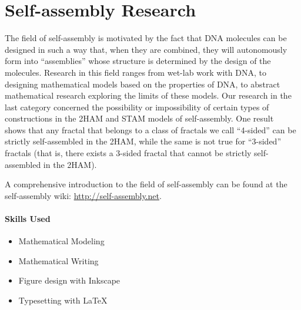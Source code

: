 \documentclass[12pt]{article}
\makeatletter
\newcommand\nocaption[1]{\newline\footnotesize\sffamily #1}
\newcommand\sectionsubtitle[1]{\def\@sectionsubtitle{#1}}
\makeatother
\begin{document}

\clearpage
\sectionsubtitle{University of Wisconsin-River Falls}
\section*{Self-assembly Research}
\thispagestyle{plain}

The field of self-assembly is motivated by the fact that DNA molecules can be designed in such a way that, when they are combined, they will autonomously form into ``assemblies'' whose structure is determined by the design of the molecules.  Research in this field ranges from wet-lab work with DNA, to designing mathematical models based on the properties of DNA, to abstract mathematical research exploring the limits of these models.  Our research in the last category concerned the possibility or impossibility of certain types of constructions in the 2HAM and STAM models of self-assembly. One result~\cite{4sided} shows that any fractal that belongs to a class of fractals we call ``4-sided'' can be strictly self-assembled in the 2HAM, while the same is not true for ``3-sided'' fractals (that is, there exists a 3-sided fractal that cannot be strictly self-assembled in the 2HAM).

A comprehensive introduction to the field of self-assembly can be found at the self-assembly wiki: \url{http://self-assembly.net}.

\paragraph{Skills Used}
\begin{itemize}
\item Mathematical Modeling
\item Mathematical Writing 
\item Figure design with Inkscape
\item Typesetting with LaTeX
\end{itemize}

\end{document}
